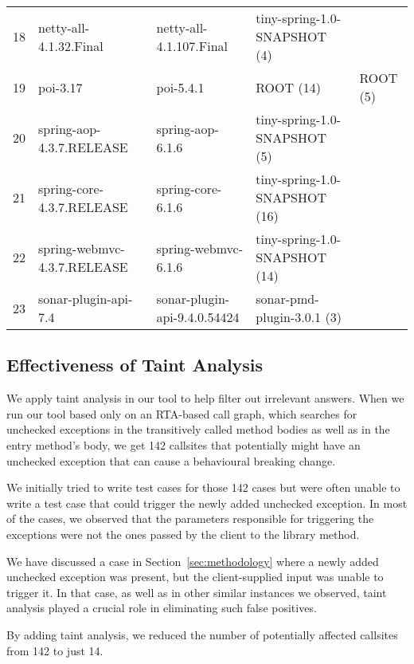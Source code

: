\begin{table*}[hbt!]
\begin{tabular}{c >{\raggedright\arraybackslash}p{3.5cm} >{\raggedright\arraybackslash}p{3.5cm} >{\raggedright\arraybackslash}p{6cm} >{\centering\arraybackslash}p{2cm}}
18 & netty-all-4.1.32.Final & netty-all-4.1.107.Final & tiny-spring-1.0-SNAPSHOT (4) & \\
19 & poi-3.17 & poi-5.4.1 & ROOT (14) & ROOT (5)\\
20 & spring-aop-4.3.7.RELEASE & spring-aop-6.1.6 & tiny-spring-1.0-SNAPSHOT (5) & \\
21 & spring-core-4.3.7.RELEASE & spring-core-6.1.6 & tiny-spring-1.0-SNAPSHOT (16) & \\
22 & spring-webmvc-4.3.7.RELEASE & spring-webmvc-6.1.6 & tiny-spring-1.0-SNAPSHOT (14) & \\
23 & sonar-plugin-api-7.4 & sonar-plugin-api-9.4.0.54424 & sonar-pmd-plugin-3.0.1 (3) & \\
\bottomrule
\end{tabular}
\end{table*}


\subsection{Effectiveness of Taint Analysis}

We apply taint analysis in our tool to help filter out irrelevant answers. When we run our tool based only on an RTA-based call graph, which
searches for unchecked exceptions in the transitively called method bodies as well as in the entry method's body, we get
142 callsites that potentially might have an unchecked exception that can cause a behavioural breaking change.

We initially tried to write test cases for those 142 cases but were often unable to write a test case that could trigger
the newly added unchecked exception. In most of the cases, we observed that the parameters responsible for triggering the 
exceptions were not the ones passed by the client to the library method.

We have discussed a case in Section~\ref{sec:methodology} where a newly added unchecked exception was present, but the client-supplied input was unable to trigger it. In that case, as well as in other similar instances we observed, taint analysis played a crucial role in eliminating such false positives.

\vspace{1em}
\begin{tcolorbox}[colback=gray!10, colframe=black]
By adding taint analysis, we reduced the number of potentially affected callsites from 142 to just 14.
\end{tcolorbox}
\vspace{1em}


